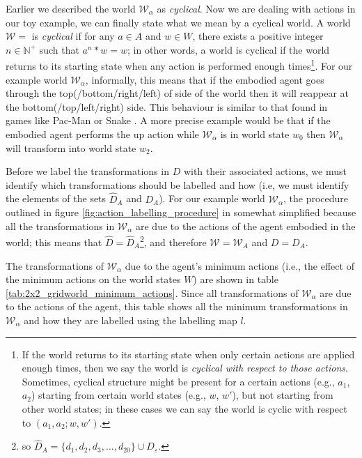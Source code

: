 Earlier we described the world $\mathscr{W}_{\alpha}$ as \emph{cyclical}.
Now we are dealing with actions in our toy example, we can finally state what we mean by a cyclical world.
A world $\mathscr{W} = $ is \emph{cyclical} if for any $a \in A$ and $w \in W$, there exists a positive integer $n \in \mathbb{N}^{+}$ such that $a^{n} \ast w = w$; in other words, a world is cyclical if the world returns to its starting state when any action is performed enough times\footnote{
	If the world returns to its starting state when only certain actions are applied enough times, then we say the world is \emph{cyclical with respect to those actions}.
	Sometimes, cyclical structure might be present for a certain actions (e.g., $a_{1}$, $a_{2}$) starting from certain world states (e.g., $w$, $w'$), but not starting from other world states; in these cases we can say the world is cyclic with respect to $(a_{1}, a_{2}; w, w')$.
}.
For our example world $\mathscr{W}_{\alpha}$, informally, this means that if the embodied agent goes through the top(/bottom/right/left) of side of the world then it will reappear at the bottom(/top/left/right) side.
This behaviour is similar to that found in games like Pac-Man  or Snake .
A more precise example would be that if the embodied agent performs the up action while $\mathscr{W}_{\alpha}$ is in world state $w_{0}$ then $\mathscr{W}_{\alpha}$ will transform into world state $w_{2}$.

Before we label the transformations in $D$ with their associated actions, we must identify which transformations should be labelled and how (i.e, we must identify the elements of the sets $\hat{D}_{A}$ and $D_{A}$).
For our example world $\mathscr{W}_{\alpha}$, the procedure outlined in figure \ref{fig:action_labelling_procedure} in somewhat simplified because all the transformations in $\mathscr{W}_{\alpha}$ are due to the actions of the agent embodied in the world; this means that $\hat{D} = \hat{D}_{A}$\footnote{so $\hat{D}_{A} = \{ d_{1}, d_{2}, d_{3}, \dots, d_{20} \} \cup D_{\varepsilon}$.}, and therefore $\mathscr{W} = \mathscr{W}_{A}$ and $D = D_{A}$.

The transformations of $\mathscr{W}_{\alpha}$ due to the agent's minimum actions (i.e., the effect of the minimum actions on the world states $W$) are shown in table \ref{tab:2x2_gridworld_minimum_actions}.
Since all transformations of $\mathscr{W}_{\alpha}$ are due to the actions of the agent, this table shows all the minimum transformations in $\mathscr{W}_{\alpha}$ and how they are labelled using the labelling map $l$.

